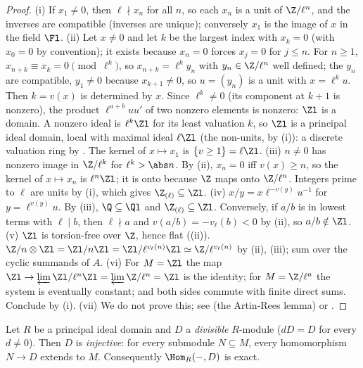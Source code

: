 \begin{proof}
(i) If $x_1\ne0$, then $\ell\nmid x_n$ for all $n$, so each $x_n$ is a unit of $\Z/\ell^n$, and the inverses are compatible (inverses are unique);
conversely $x_1$ is the image of $x$ in the field $\Fl$.
(ii) Let $x\ne0$ and let $k$ be the largest index with $x_k=0$ (with $x_0=0$ by convention); it exists because $x_n=0$ forces $x_j=0$ for
$j\le n$. For $n\ge1$, $x_{n+k}\equiv x_k=0\pmod{\ell^k}$, so $x_{n+k}=\ell^ky_n$ with $y_n\in\Z/\ell^n$ well defined; the $y_n$ are compatible, $y_1\ne0$ because
$x_{k+1}\ne0$, so $u=(y_n)$ is a unit with $x=\ell^ku$. Then $k=v(x)$ is determined by $x$. Since $\ell^k\ne0$ (its component at $k+1$ is
nonzero), the product $\ell^{a+b}uu'$ of two nonzero elements is nonzero: $\Zl$ is a domain. A nonzero ideal is $\ell^k\Zl$ for its least
valuation $k$, so $\Zl$ is a principal ideal domain, local with maximal ideal $\ell\Zl$ (the non-units, by (i)): a discrete valuation ring by
. The kernel of $x\mapsto x_1$ is $\{v\ge1\}=\ell\Zl$.
(iii) $n\ne0$ has nonzero image in $\Z/\ell^k$ for $\ell^k>\abs n$. By (ii), $x_n=0$ iff $v(x)\ge n$, so the kernel of $x\mapsto x_n$ is $\ell^n\Zl$; it is
onto because $\Z$ maps onto $\Z/\ell^n$. Integers prime to $\ell$ are units by (i), which gives $\Z_{(\ell)}\subseteq\Zl$.
(iv) $x/y=x\ell^{-v(y)}u^{-1}$ for $y=\ell^{v(y)}u$. By (iii), $\Q\subseteq\Ql$ and $\Z_{(\ell)}\subseteq\Zl$. Conversely, if $a/b$ is in lowest terms
with $\ell\mid b$, then $\ell\nmid a$ and $v(a/b)=-v_\ell(b)<0$ by (ii), so $a/b\notin\Zl$.
(v) $\Zl$ is torsion-free over $\Z$, hence flat ((ii)). $\Z/n\otimes\Zl=\Zl/n\Zl=\Zl/\ell^{v_\ell(n)}\Zl\simeq\Z/\ell^{v_\ell(n)}$ by
(ii), (iii); sum over the cyclic summands of $A$.
(vi) For $M=\Zl$ the map $\Zl\to\varprojlim\Zl/\ell^n\Zl=\varprojlim\Z/\ell^n=\Zl$ is the identity; for $M=\Z/\ell^a$ the system is eventually constant;
and both sides commute with finite direct sums. Conclude by (i).
(vii) We do not prove this; see \cite[Chapter 10]{AtiyahMacdonald} (the Artin-Rees lemma) or \cite[Chapter 7]{Eisenbud}.
\end{proof}

\begin{lemma}\label{lem:modules:baer}
Let $R$ be a principal ideal domain and $D$ a \emph{divisible} $R$-module ($dD=D$ for every $d\ne0$). Then $D$ is \emph{injective}: for every
submodule $N\subseteq M$, every homomorphism $N\to D$ extends to $M$. Consequently $\Hom_R(-,D)$ is exact.
\end{lemma}

